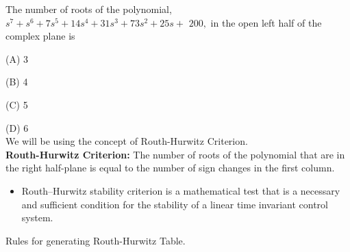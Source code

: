 The number of roots of the polynomial, $s^{7}+s^{6}+7 s^{5}+14 s^{4}+31s^{3}+73 s^{2}+25 s+$ $200,$ in the open left half of the complex plane is

(A) 3

(B) 4

(C) 5

(D) 6\\
We will be using the concept of Routh-Hurwitz Criterion.\\
\textbf{Routh-Hurwitz Criterion:} The number of roots of the polynomial that are in the right half-plane is equal to
the number of sign changes in the first column.

\begin{itemize}
    \item Routh–Hurwitz stability criterion is a mathematical test that is a necessary and sufficient condition for the stability of a linear time invariant control system.
\end{itemize}

Rules for generating Routh-Hurwitz Table.

